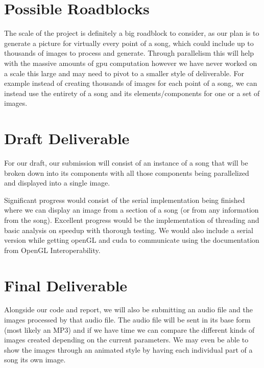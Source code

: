 \documentclass{article}
\begin{document}
\section{Possible Roadblocks}
The scale of the project is definitely a big roadblock to consider, as our plan is to generate a picture for virtually every point of a song, which could include up to thousands of images to process and generate. Through parallelism this will help with the massive amounts of gpu computation however we have never worked on a scale this large and may need to pivot to a smaller style of deliverable. For example instead of creating thousands of images for each point of a song, we can instead use the entirety of a song and its elements/components for one or a set of images. 


\section{Draft Deliverable}
For our draft, our submission will consist of an instance of a song that will be broken down into its components with all those components being parallelized and displayed into a single image. 

Significant progress would consist of the serial implementation being finished where we can display an image from a section of a song (or from any information from the song).
Excellent progress would be the implementation of threading and basic analysis on speedup with thorough testing. We would also include a serial version while getting openGL and cuda to communicate using the documentation from 
\textcolor{nvidia_green}{OpenGL Interoperability}.

\section{Final Deliverable}
Alongside our code and report, we will also be submitting an audio file and the images processed by that audio file. The audio file will be sent in its base form (most likely an MP3) and if we have time we can compare the different kinds of images created depending on the current parameters. We may even be able to show the images through an animated style by having each individual part of a song its own image.
\end{document}
